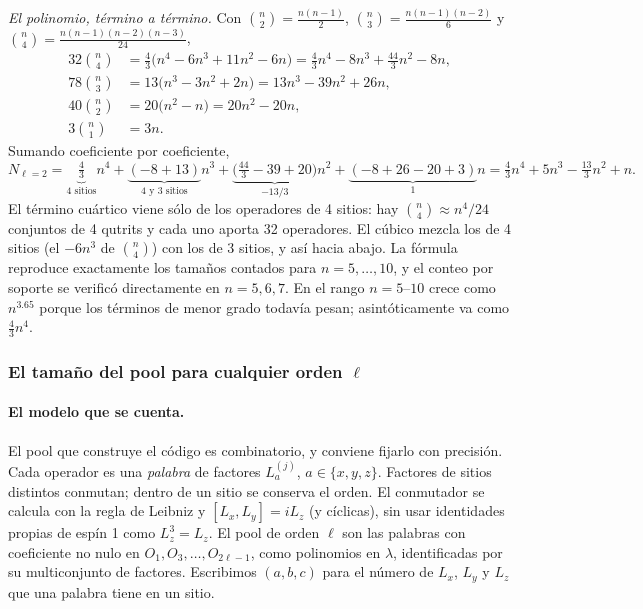 \documentclass[11pt,a4paper]{article}
\begin{document}
\emph{El polinomio, término a término.} Con
$\binom n2=\frac{n(n-1)}2$, $\binom n3=\frac{n(n-1)(n-2)}6$ y $\binom n4=\frac{n(n-1)(n-2)(n-3)}{24}$,
\begin{align*}
32\binom n4&=\tfrac43\big(n^4-6n^3+11n^2-6n\big)=\tfrac43n^4-8n^3+\tfrac{44}3n^2-8n,\\
78\binom n3&=13\big(n^3-3n^2+2n\big)=13n^3-39n^2+26n,\\
40\binom n2&=20\big(n^2-n\big)=20n^2-20n,\\
3\binom n1&=3n.
\end{align*}
Sumando coeficiente por coeficiente,
\begin{equation}
  N_{\ell=2}=\underbrace{\tfrac43}_{\text{4 sitios}}n^4
  +\underbrace{(-8+13)}_{\text{4 y 3 sitios}}n^3
  +\underbrace{\big(\tfrac{44}3-39+20\big)}_{-13/3}n^2
  +\underbrace{(-8+26-20+3)}_{1}n
  =\tfrac43n^4+5n^3-\tfrac{13}{3}n^2+n .
  \label{eq:nl2}
\end{equation}
El término cuártico viene sólo de los operadores de 4 sitios: hay $\binom n4\approx n^4/24$
conjuntos de 4 qutrits y cada uno aporta 32 operadores. El cúbico mezcla los de 4 sitios (el
$-6n^3$ de $\binom n4$) con los de 3 sitios, y así hacia abajo. La fórmula reproduce exactamente
los tamaños contados para $n=5,\dots,10$, y el conteo por soporte se verificó directamente en
$n=5,6,7$. En el rango $n=5$--$10$ crece como $n^{3.65}$ porque los términos de menor grado todavía
pesan; asintóticamente va como $\tfrac43n^4$.

\subsubsection*{El tamaño del pool para cualquier orden $\ell$}

\paragraph{El modelo que se cuenta.} El pool que construye el código es combinatorio, y conviene
fijarlo con precisión. Cada operador es una \emph{palabra} de factores $L_a^{(j)}$, $a\in\{x,y,z\}$.
Factores de sitios distintos conmutan; dentro de un sitio se conserva el orden. El conmutador se
calcula con la regla de Leibniz y $[L_x,L_y]=iL_z$ (y cíclicas), sin usar identidades propias de
espín 1 como $L_z^3=L_z$. El pool de orden $\ell$ son las palabras con coeficiente no nulo en
$O_1,O_3,\dots,O_{2\ell-1}$, como polinomios en $\lambda$, identificadas por su multiconjunto de
factores. Escribimos $(a,b,c)$ para el número de $L_x$, $L_y$ y $L_z$ que una palabra tiene en un
sitio.
\end{document}
